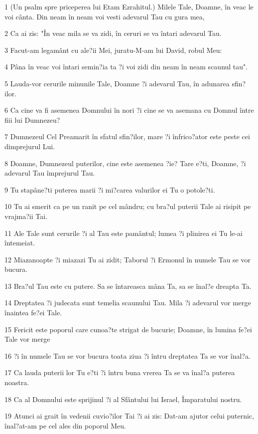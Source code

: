 \par 1 (Un psalm spre priceperea lui Etam Ezrahitul.) Milele Tale, Doamne, în veac le voi cânta. Din neam în neam voi vesti adevarul Tau cu gura mea,
\par 2 Ca ai zis: "În veac mila se va zidi, în ceruri se va întari adevarul Tau.
\par 3 Facut-am legamânt cu ale?ii Mei, juratu-M-am lui David, robul Meu:
\par 4 Pâna în veac voi întari semin?ia ta ?i voi zidi din neam în neam scaunul tau".
\par 5 Lauda-vor cerurile minunile Tale, Doamne ?i adevarul Tau, în adunarea sfin?ilor.
\par 6 Ca cine va fi asemenea Domnului în nori ?i cine se va asemana cu Domnul între fiii lui Dumnezeu?
\par 7 Dumnezeul Cel Preamarit în sfatul sfin?ilor, mare ?i înfrico?ator este peste cei dimprejurul Lui.
\par 8 Doamne, Dumnezeul puterilor, cine este asemenea ?ie? Tare e?ti, Doamne, ?i adevarul Tau împrejurul Tau.
\par 9 Tu stapâne?ti puterea marii ?i mi?carea valurilor ei Tu o potole?ti.
\par 10 Tu ai smerit ca pe un ranit pe cel mândru; cu bra?ul puterii Tale ai risipit pe vrajma?ii Tai.
\par 11 Ale Tale sunt cerurile ?i al Tau este pamântul; lumea ?i plinirea ei Tu le-ai întemeiat.
\par 12 Miazanoapte ?i miazazi Tu ai zidit; Taborul ?i Ermonul în numele Tau se vor bucura.
\par 13 Bra?ul Tau este cu putere. Sa se întareasca mâna Ta, sa se înal?e dreapta Ta.
\par 14 Dreptatea ?i judecata sunt temelia scaunului Tau. Mila ?i adevarul vor merge înaintea fe?ei Tale.
\par 15 Fericit este poporul care cunoa?te strigat de bucurie; Doamne, în lumina fe?ei Tale vor merge
\par 16 ?i în numele Tau se vor bucura toata ziua ?i întru dreptatea Ta se vor înal?a.
\par 17 Ca lauda puterii lor Tu e?ti ?i întru buna vrerea Ta se va înal?a puterea noastra.
\par 18 Ca al Domnului este sprijinul ?i al Sfântului lui Israel, Împaratului nostru.
\par 19 Atunci ai grait în vedenii cuvio?ilor Tai ?i ai zis: Dat-am ajutor celui puternic, înal?at-am pe cel ales din poporul Meu.
